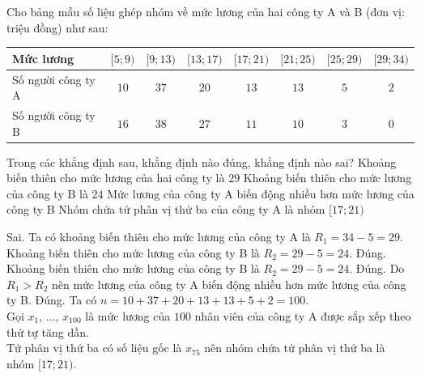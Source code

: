 \begin{ex}%
	Cho bảng mẫu số liệu ghép nhóm về mức lương của hai công ty A và B (đơn vị: triệu đồng) như sau:
	\begin{center}
		\begin{tabular}{|>{\centering\arraybackslash}m{3cm}|c|c|c|c|c|c|c|}
			\hline
			Mức lương & $[5; 9)$ & $[9; 13)$ & $[13; 17)$ & $[17; 21)$ & $[21; 25)$ & $[25; 29)$ & $[29; 34)$ \\ \hline
			Số người công ty A & $10$ & $37$ & $20$ & $13$ & $13$ & $5$ & $2$ \\ \hline
			Số người công ty B & $16$ & $38$ & $27$ &$11$ & $10$ & $3$ & $0$ \\ \hline
		\end{tabular}
	\end{center}
	Trong các khẳng định sau, khẳng định nào đúng, khẳng định nào sai?
\choiceTF
{Khoảng biến thiên cho mức lương của hai công ty là $29$}
{\True Khoảng biến thiên cho mức lương của công ty B là $24$}
{\True Mức lương của công ty A biến động nhiều hơn mức lương của công ty B}
{\True Nhóm chứa tứ phân vị thứ ba của công ty A là nhóm $[17; 21)$}
\loigiai
{
\begin{itemchoice}
\itemch Sai. Ta có khoảng biến thiên cho mức lương của công ty A là $R_1 = 34 - 5 = 29$. \\
Khoảng biến thiên cho mức lương của công ty B là $R_2 = 29 - 5 = 24$. 
\itemch Đúng. Khoảng biến thiên cho mức lương của công ty B là $R_2 = 29 - 5 = 24$. 
\itemch Đúng. Do $R_1 > R_2$ nên mức lương của công ty A biến động nhiều hơn mức lương của công ty B.
\itemch Đúng. Ta có $n = 10 + 37 + 20 + 13 + 13 + 5 + 2 = 100$.\\
Gọi $x_1$, $\ldots$, $x_{100}$ là mức lương của $100$ nhân viên của công ty A được sắp xếp theo thứ tự tăng dần. \\
Tứ phân vị thứ ba có số liệu gốc là $x_{75}$ nên nhóm chứa tứ phân vị thứ ba là nhóm $[17; 21)$.
\end{itemchoice}
}
\end{ex}

